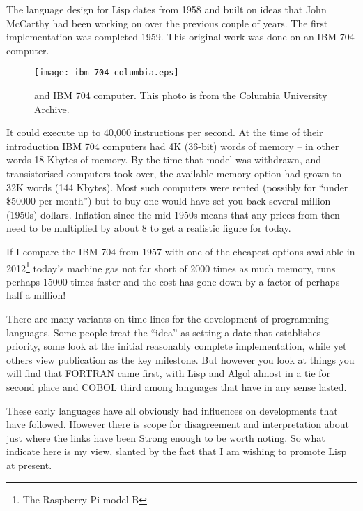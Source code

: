 The language design for Lisp dates from 1958 and built on ideas that
John McCarthy had been working on over the previous couple of years.
The first implementation was completed 1959. This
original work was done on an IBM 704 computer.
\begin{figure}
\begin{center}
\texttt{[image: ibm-704-columbia.eps]}
\end{center}
\caption{and IBM 704 computer. This photo is from the Columbia University
Archive.}
\end{figure}
It could execute
up to 40,000 instructions per second. At the time of their introduction
IBM 704 computers had 4K (36-bit) words of memory -- in other words
18 Kbytes of memory. By the time that model was withdrawn, and transistorised
computers took over, the available memory option had grown to 32K words
(144 Kbytes). Most such computers were rented (possibly for ``under \$50000
per month'') but to buy one would have set you back several million (1950s)
dollars. Inflation since the mid 1950s means that any prices from then
need to be multiplied by about 8 to get a realistic figure for today.


If I compare the IBM 704 from 1957 with one of the cheapest options
available in 2012\footnote{The Raspberry Pi model B} today's machine
gas not far short of 2000 times as much memory, runs perhaps 15000 times
faster and the cost has gone down by a factor of perhaps half a million!

There are many variants on time-lines for the development of programming
languages. Some people treat the ``idea'' as setting a date that
establishes priority, some look at the initial reasonably complete
implementation, while yet others view publication as the key milestone.
But however you look at things you will find that FORTRAN came first, with
Lisp and Algol almost in a tie for second place and COBOL third among
languages that have in any sense lasted.

These early languages have all obviously had influences on developments
that have followed. However there is scope for disagreement and interpretation
about just where the links have been Strong enough to be worth noting. So
what indicate here is my view, slanted by the fact that I am wishing to
promote Lisp at present.

